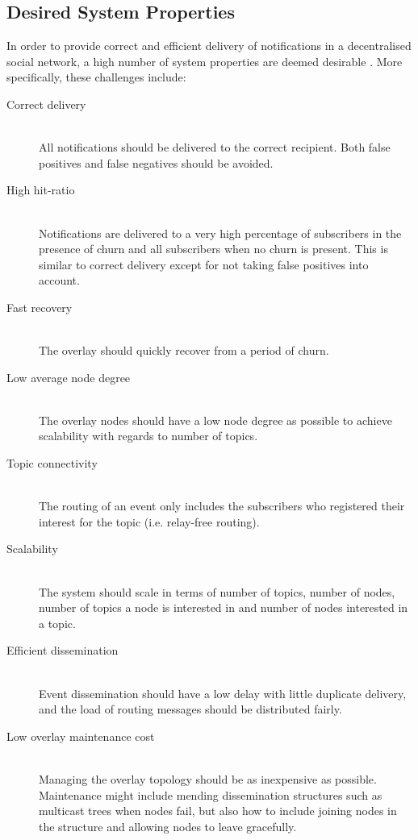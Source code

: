\subsection{ Desired System Properties }
In order to provide correct and efficient delivery of notifications in a
decentralised social network, a high number of system properties are
deemed desirable \cite{Setty:2012}.  More specifically, these challenges
include: 

\begin{description}

\item[Correct delivery] \hfill\\ 
All notifications should be delivered to the
correct recipient. Both false positives and false negatives should be
avoided.

\item[High hit-ratio]\hfill\\
Notifications are delivered to a very high
percentage of subscribers in the presence of churn and all subscribers
when no churn is present. This is similar to correct delivery except for
not taking false positives into account.

\item[Fast recovery]\hfill\\
The overlay should quickly recover from a
period of churn.

\item[Low average node degree]\hfill\\
The overlay nodes should have a low
node degree as possible to achieve scalability with regards to number of
topics.

\item[Topic connectivity]\hfill\\
The routing of an event only includes the
subscribers who registered their interest for the topic (i.e.
relay-free routing).

\item[Scalability]\hfill\\
The system should scale in terms of number of
topics, number of nodes, number of topics a node is interested in and
number of nodes interested in a topic.

\item[Efficient dissemination]\hfill\\
Event dissemination should have a low
delay with little duplicate delivery, and the load of routing messages
should be distributed fairly.

\item[Low overlay maintenance cost]\hfill\\
Managing the overlay topology
should be as inexpensive as possible. Maintenance might include mending
dissemination structures such as multicast trees when nodes fail, but
also how to include joining nodes in the structure and allowing nodes to
leave gracefully.

\end{description}

